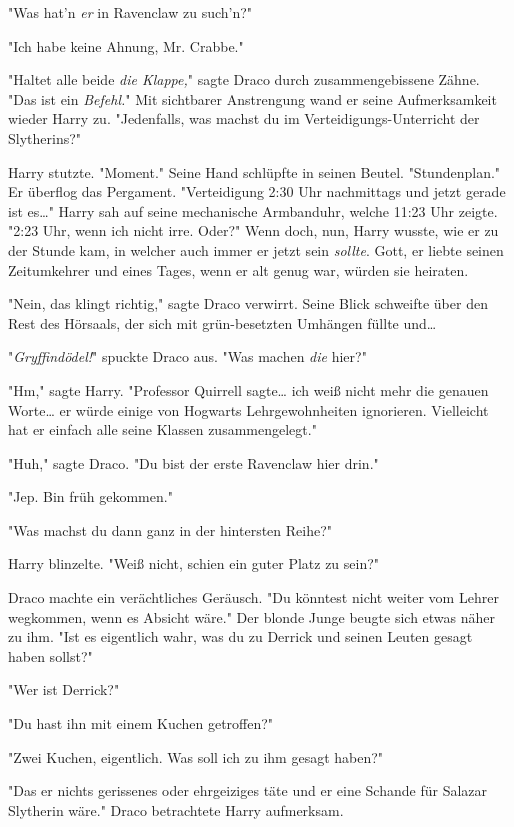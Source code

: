 {"Was hat'n \emph{er} in Ravenclaw zu such'n?"

"Ich habe keine Ahnung, Mr. Crabbe."

"Haltet alle beide \emph{die Klappe,}" sagte Draco durch zusammengebissene Zähne. "Das ist ein \emph{Befehl.}" Mit sichtbarer Anstrengung wand er seine Aufmerksamkeit wieder Harry zu. "Jedenfalls, was machst du im Verteidigungs-Unterricht der Slytherins?"

Harry stutzte. "Moment." Seine Hand schlüpfte in seinen Beutel. "Stundenplan." Er überflog das Pergament. "Verteidigung 2:30 Uhr nachmittags und jetzt gerade ist es…" Harry sah auf seine mechanische Armbanduhr, welche 11:23 Uhr zeigte. "2:23 Uhr, wenn ich nicht irre. Oder?" Wenn doch, nun, Harry wusste, wie er zu der Stunde kam, in welcher auch immer er jetzt sein \emph{sollte}. Gott, er liebte seinen Zeitumkehrer und eines Tages, wenn er alt genug war, würden sie heiraten.

"Nein, das klingt richtig," sagte Draco verwirrt. Seine Blick schweifte über den Rest des Hörsaals, der sich mit grün-besetzten Umhängen füllte und…

"\emph{Gryffindödel!}" spuckte Draco aus. "Was machen \emph{die} hier?"

"Hm," sagte Harry. "Professor Quirrell sagte… ich weiß nicht mehr die genauen Worte… er würde einige von Hogwarts Lehrgewohnheiten ignorieren. Vielleicht hat er einfach alle seine Klassen zusammengelegt."

"Huh," sagte Draco. "Du bist der erste Ravenclaw hier drin."

"Jep. Bin früh gekommen."

"Was machst du dann ganz in der hintersten Reihe?"

Harry blinzelte. "Weiß nicht, schien ein guter Platz zu sein?"

Draco machte ein verächtliches Geräusch. "Du könntest nicht weiter vom Lehrer wegkommen, wenn es Absicht wäre." Der blonde Junge beugte sich etwas näher zu ihm. "Ist es eigentlich wahr, was du zu Derrick und seinen Leuten gesagt haben sollst?"

"Wer ist Derrick?"

"Du hast ihn mit einem Kuchen getroffen?"

"Zwei Kuchen, eigentlich. Was soll ich zu ihm gesagt haben?"

"Das er nichts gerissenes oder ehrgeiziges täte und er eine Schande für Salazar Slytherin wäre." Draco betrachtete Harry aufmerksam.

}
